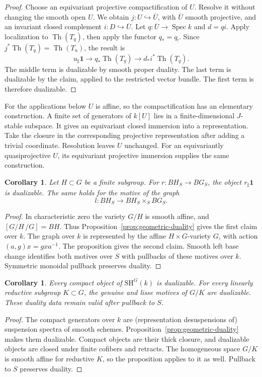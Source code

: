 \documentclass[11pt,reqno]{amsart}
\newtheorem{corollary}[theorem]{Corollary}
\theoremstyle{definition}
\theoremstyle{remark}
\theoremstyle{plain}
\numberwithin{equation}{section}
\newcommand{\SH}{\mathrm{SH}}
\newcommand{\one}{\mathbf 1}
\DeclareMathOperator{\Spec}{Spec}
\DeclareMathOperator{\Th}{Th}
\begin{document}
\begin{proof}
Choose an equivariant projective compactification of \(U\).
Resolve it without changing the smooth open \(U\).
We obtain \(j:U\hookrightarrow\overline U\), with \(\overline U\) smooth projective,
and an invariant closed complement \(i:D\hookrightarrow\overline U\).
Let \(q:\overline U\to\Spec k\) and \(d=qi\).
Apply localization to \(\Th(T_q)\), then apply the functor \(q_*=q_!\).
Since \(j^*\Th(T_q)=\Th(T_u)\), the result is
\begin{equation}\label{eq:open-duality}
 u_\sharp\one\longrightarrow q_*\Th(T_q)\longrightarrow d_*i^*\Th(T_q).
\end{equation}
The middle term is dualizable by smooth proper duality.
The last term is dualizable by the claim, applied to the restricted vector bundle.
The first term is therefore dualizable.
\end{proof}

For the applications below \(U\) is affine, so the compactification has an elementary construction.
A finite set of generators of \(k[U]\) lies in a finite-dimensional \(J\)-stable subspace.
It gives an equivariant closed immersion into a representation.
Take the closure in the corresponding projective representation after adding a trivial coordinate.
Resolution leaves \(U\) unchanged.
For an equivariantly quasiprojective \(U\), its equivariant projective immersion supplies the same construction.

\begin{corollary}\label{cor:graph-dual}
Let \(H\subset G\) be a finite subgroup.
For \(r:BH_S\to BG_S\), the object \(r_\sharp\one\) is dualizable.
The same holds for the motive of the graph
\[
 l:BH_S\longrightarrow BH_S\times_S BG_S.
\]
\end{corollary}
\begin{proof}
In characteristic zero the variety \(G/H\) is smooth affine, and \([G/H\,/G]=BH\).
Thus Proposition~\ref{prop:geometric-duality} gives the first claim over \(k\).
The graph over \(k\) is represented by the affine \(H\times G\)-variety \(G\),
with action \((a,g)x=gxa^{-1}\).
The proposition gives the second claim.
Smooth left base change identifies both motives over \(S\) with pullbacks of these motives over \(k\).
Symmetric monoidal pullback preserves duality.
\end{proof}


\begin{corollary}\label{cor:absolute-compact-duality}
Every compact object of \(\SH^G(k)\) is dualizable.
For every linearly reductive subgroup \(K\subset G\), the genuine
and lisse motives of \(G/K\) are dualizable.
These duality data remain valid after pullback to \(S\).
\end{corollary}
\begin{proof}
The compact generators over \(k\) are (representation desuspensions
of) suspension spectra of smooth schemes.
Proposition~\ref{prop:geometric-duality} makes them dualizable.
Compact objects are their thick closure, and dualizable objects are
closed under finite cofibers and retracts.
The homogeneous space \(G/K\) is smooth affine for reductive \(K\),
so the proposition applies to it as well.
Pullback to \(S\) preserves duality.
\end{proof}
\end{document}
